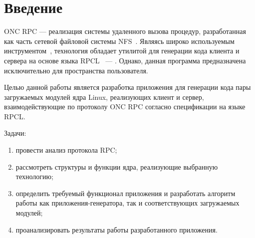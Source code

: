 \section*{Введение}

ONC RPC --- реализация системы удаленного вызова процедур, разработанная как
часть сетевой файловой системы NFS~\cite{rfc1094}. Являясь широко используемым
инструментом~\cite{rfc5531}, технология обладает утилитой для генерации кода
клиента и сервера на основе языка RPCL~\cite{rfc5531} --- .
Однако, данная программа предназначена исключительно для пространства
пользователя.

Целью данной работы является разработка приложения для генерации кода пары
загружаемых модулей ядра Linux, реализующих клиент и сервер, взаимодействующие
по протоколу ONC RPC согласно спецификации на языке RPCL.

Задачи:
\begin{enumerate}
    \item провести анализ протокола RPC;
    \item рассмотреть структуры и функции ядра, реализующие выбранную
          технологию;
    \item определить требуемый функционал приложения и разработать алгоритм
          работы как приложения-генератора, так и соответствующих загружаемых
          модулей;
    \item проанализировать результаты работы разработанного приложения.
\end{enumerate}

\pagebreak

